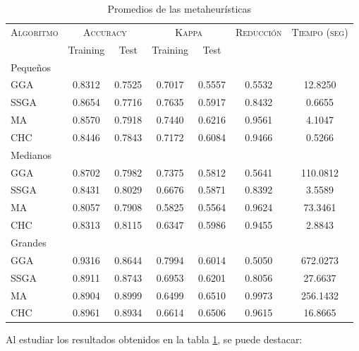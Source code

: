 \begin{table}[h!]
\centering
\begin{tabular}{l c c c c c c}
\hline
\multirow{2}{*}{\textsc{Algoritmo}}
	& \multicolumn{2}{c}{\textsc{Accuracy}}
	& \multicolumn{2}{c}{\textsc{Kappa}}
	& \textsc{Reducción}
	& \textsc{Tiempo (seg)} \\
	& Training & Test
	& Training & Test \\ 
\hline
\hline

Pequeños\\
GGA  & 0.8312 & 0.7525 & 0.7017 & 0.5557 & 0.5532 & 12.8250 \\
SSGA & 0.8654 & 0.7716 & 0.7635 & 0.5917 & 0.8432 & 0.6655 \\
MA   & 0.8570 & 0.7918 & 0.7440 & 0.6216 & 0.9561 & 4.1047 \\
CHC & 0.8446 & 0.7843 & 0.7172 & 0.6084 & 0.9466 & 0.5266 \\

\hline

Medianos\\
GGA  & 0.8702 & 0.7982 & 0.7375 & 0.5812 & 0.5641 & 110.0812 \\
SSGA & 0.8431 & 0.8029 & 0.6676 & 0.5871 & 0.8392 & 3.5589 \\
MA   & 0.8057 & 0.7908 & 0.5825 & 0.5564 & 0.9624 & 73.3461 \\
CHC  & 0.8313 & 0.8115 & 0.6347 & 0.5986 & 0.9455 & 2.8843 \\

\hline
Grandes\\
GGA  & 0.9316 & 0.8644 & 0.7994 & 0.6014 & 0.5050 & 672.0273 \\
SSGA & 0.8911 & 0.8743 & 0.6953 & 0.6201 & 0.8056 & 27.6637 \\
MA   & 0.8904 & 0.8999 & 0.6499 & 0.6510 & 0.9973 & 256.1432 \\
CHC  & 0.8961 & 0.8934 & 0.6614 & 0.6506 & 0.9615 & 16.8665 \\

\hline
\end{tabular}
\caption{Promedios de las metaheurísticas}
\label{meta}
\end{table}

Al estudiar los resultados obtenidos en la tabla \ref{meta}, se puede destacar:

